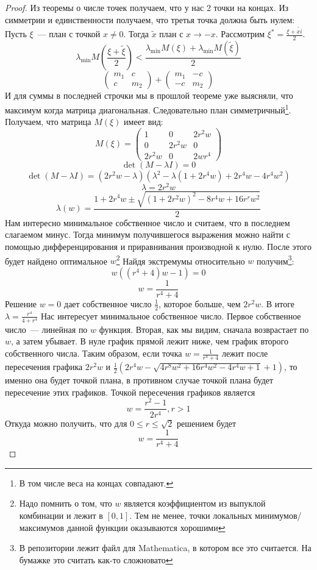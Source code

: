  \begin{proof}
Из теоремы о числе точек получаем, что у нас 2 точки на концах. Из симметрии и единственности получаем, что третья точка должна быть нулем:
Пусть $\xi$ — план с точкой $x \neq 0$. Тогда $\tilde{x}$ план с $x\rightarrow -x$. Рассмотрим $\xi^{*} = \frac{\xi+\tilde{xi}}{2}$. 
$$\lambda_{\min}M(\frac{\xi+\tilde{\xi}}{2}) < \frac{\lambda_{\min}M(\xi) + \lambda_{\min} M(\tilde{\xi})}{2}$$
$$ \begin{pmatrix} m_1 & c \\ c & m_2 \end{pmatrix} + \begin{pmatrix} m_1 & -c \\ -c & m_2 \end{pmatrix}$$
И для суммы в последней строчки мы в прошлой теореме уже выясняли, что максимум когда матрица диагональная. 
Следовательно план симметричный\footnote{В том числе веса на концах совпадают.}. Получаем, что матрица $M(\xi)$ имеет вид:
$$M(\xi) = \begin{pmatrix} 1 & 0 & 2r^2w \\ 0 & 2r^2 w & 0 \\ 2r^2w & 0 & 2wr^4 \end{pmatrix}$$
$$\det (M - \lambda I) = 0$$
$$\det(M-\lambda I) = \left(2r^2 w - \lambda\right)\left(\lambda^2 - \lambda(1 + 2r^4 w)+2r^4w - 4r^4w^2\right)$$
$$\lambda = 2r^2 w$$
$$\lambda(w) = \frac{1 + 2r^4w ± \sqrt{(1+2r^2w)^2 - 8r^4w + 16r^rw^2}}{2}$$
Нам интересно минимальное собственное число и считаем, что в последнем слагаемом минус. Тогда минимум получившегося выражения можно найти с помощью дифференцирования и приравнивания производной к нулю. После этого будет найдено оптимальное $w$\footnote{Надо помнить о том, что $w$ является коэффициентом из выпуклой комбинации и лежит в $[0,1]$. Тем не менее, точки локальных минимумов/максимумов данной функции оказываются хорошими}
Найдя экстремумы относительно $w$ получим\footnote{В репозитории лежит файл для Mathematica, в котором все это считается. На бумажке это считать как-то сложновато}:
$$ w((r^4+4)w - 1) = 0$$
$$w = \frac{1}{r^4 + 4}$$
Решение $w=0$ дает собственное число $\frac{1}{2}$, которое больше, чем $2r^2w$.  
В итоге 
$\lambda = \frac{r^4}{4+r^4}$
Нас интересует минимальное собственное число. Первое собственное число — линейная по $w$ функция. Вторая, как мы видим, сначала возврастает по $w$, а затем убывает. В нуле график прямой лежит ниже, чем график второго собственного числа. Таким образом, если точка $w=\frac{1}{r^4 + 4}$ лежит после пересечения графика $2r^2w$ и 
$\frac{1}{2} \left(2 r^4 w-\sqrt{4 r^8 w^2+16 r^4 w^2-4 r^4 w+1}+1\right)$, то именно она будет точкой плана, в противном случае точкой плана будет пересечение этих графиков.
Точкой пересечения графиков является
$$w=\frac{r^2-1}{2 r^4}, r > 1$$
Откуда можно получить, что для $0 \leq r \leq \sqrt{2}$ решением будет 
$$w=\frac{1}{r^4 + 4}$$
 \end{proof}


